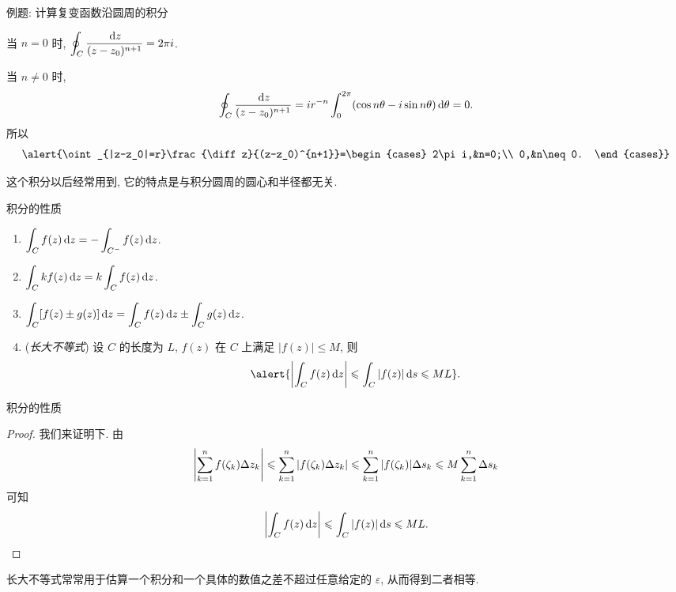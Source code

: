 \begin{frame}{例题: 计算复变函数沿圆周的积分}
\begin{solutionc}
当 $n=0$ 时, $\displaystyle\oint_C\frac{\,\mathrm{d} z}{(z-z_0)^{n+1}}=2\pi i$.

\onslide<+->
当 $n\neq 0$ 时, 
\[\oint_C\frac{\,\mathrm{d} z}{(z-z_0)^{n+1}}
=ir^{-n}\int_0^{2\pi}(\cos{n\theta}-i\sin{n\theta})\,\mathrm{d}\theta=0.\]
\onslide<+->
所以
\[\alert{\oint_{|z-z_0|=r}\frac{\diff z}{(z-z_0)^{n+1}}=\begin{cases}
2\pi i,&n=0;\\
0,&n\neq 0.
\end{cases}}\]
\end{solutionc}
\onslide<+->
这个积分以后经常用到, 它的特点是与积分圆周的圆心和半径都无关.
\end{frame}


\begin{frame}{积分的性质}
\begin{theorem}
\begin{enumerate}
\item $\displaystyle\int_Cf(z)\,\mathrm{d} z=-\displaystyle\int_{C^-}f(z)\,\mathrm{d} z$.
\item $\displaystyle\int_Ckf(z)\,\mathrm{d} z=k\displaystyle\int_Cf(z)\,\mathrm{d} z$.
\item $\displaystyle\int_C[f(z)\pm g(z)]\,\mathrm{d} z
=\displaystyle\int_Cf(z)\,\mathrm{d} z\pm\displaystyle\int_Cg(z)\,\mathrm{d} z$.
\item (\emph{长大不等式}) 设 $C$ 的长度为 $L$, $f(z)$ 在 $C$ 上满足 $|f(z)|\le M$, 则
\[\alert{\abs{\int_Cf(z)\diff z}\le\int_C|f(z)|\diff s\le ML}.\]
\end{enumerate}
\end{theorem}
\end{frame}


\begin{frame}{积分的性质}
\begin{proof}
我们来证明下.
\onslide<+->
由
\[\left|\sum_{k=1}^n f(\zeta_k)\Delta z_k\right|
\leqslant\sum_{k=1}^n|f(\zeta_k)\Delta z_k|
\leqslant\sum_{k=1}^n|f(\zeta_k)|\Delta s_k
\leqslant M\sum_{k=1}^n\Delta s_k\]
\onslide<+->
可知
\[\left|\int_Cf(z)\,\mathrm{d} z\right|\leqslant\int_C|f(z)|\,\mathrm{d} s\leqslant ML.\qedhere\]
\end{proof}
\onslide<+->
长大不等式常常用于估算一个积分和一个具体的数值之差不超过任意给定的 $\varepsilon$, 从而得到二者相等.
\end{frame}


